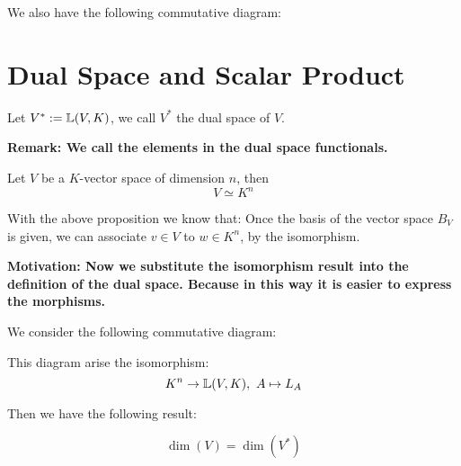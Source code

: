 \documentclass[11pt]{article}
\begin{document}
We also have the following commutative diagram:
\begin{center}\end{center}
\section{Dual Space and Scalar Product}
\label{sec:org14e2a26}

\begin{definition}
Let \(V^{\ast}:= \mathbb{L}(V,K)\), we call \(V^{\ast}\) the dual space of \(V\).
\end{definition}

\textbf{Remark: We call the elements in the dual space functionals.}

\begin{proposition}[ ]
Let \(V\) be a \(K\)-vector space of dimension \(n\), then
\[
V \simeq K^n
\]
\end{proposition}

With the above proposition we know that: Once the basis of the vector space \(B_V\) is given, we can associate \(v \in V\) to \(w \in K^n\), by the isomorphism.

\textbf{Motivation: Now we substitute the isomorphism result into the definition of the dual space. Because in this way it is easier to express the morphisms.}

We consider the following commutative diagram:

\begin{center}\end{center}

This diagram arise the isomorphism:
\[
K^n \to \mathbb{L}(V,K), \ A \mapsto L_A
\]

Then we have the following result:
\begin{proposition}[ ]
\[
\dim(V) = \dim(V^{\ast})
\]
\end{proposition}
\end{document}

